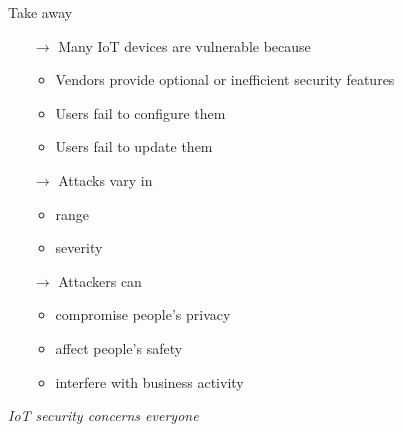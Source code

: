 \begin{frame}{Take away}
    \begin{itemize}
        \item[$\rightarrow$] Many IoT devices are vulnerable because
        \begin{itemize}
            \item Vendors provide optional or inefficient security features
            \item Users fail to configure them
            \item Users fail to update them
        \end{itemize}
        \item[$\rightarrow$] Attacks vary in 
        \begin{itemize}
            \item range
            \item severity
        \end{itemize}
        \item[$\rightarrow$] Attackers can
        \begin{itemize}
            \item compromise people's privacy
            \item affect people's safety
            \item interfere with business activity 
        \end{itemize}
    \end{itemize}
    
    \begin{center}
        \emph{IoT security concerns everyone}
    \end{center}
\end{frame}